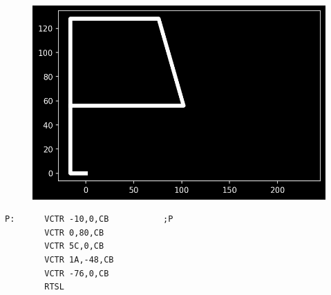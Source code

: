 \begin{minipage}[c]{0.48\linewidth}
\begin{figure}[H]
    \centering
    \begin{adjustbox}{width=4cm,center}
      \includegraphics[width=12cm]{src/titles/letters/P.png}%
    \end{adjustbox}
\end{figure}
\end{minipage}
\begin{minipage}[c]{0.48\linewidth}
\begin{lstlisting}[basicstyle=\scriptsize\ttfamily]
P:      VCTR -10,0,CB           ;P
        VCTR 0,80,CB
        VCTR 5C,0,CB
        VCTR 1A,-48,CB
        VCTR -76,0,CB
        RTSL
\end{lstlisting}
\vspace*{\fill}
\end{minipage}

